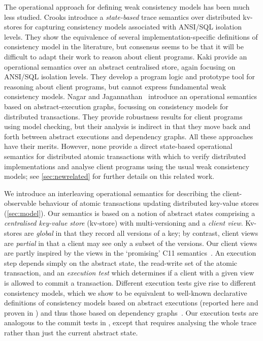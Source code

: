 The operational approach for defining weak consistency models has been
much less studied.  Crooks \etal\citet{seebelieve} introduce
a {\em state-based} trace semantics over distributed kv-stores for
capturing consistency models associated with ANSI/SQL isolation
levels. They show the equivalence of several
implementation-specific definitions of consistency model in the
literature, but  consensus seems to be that it will be difficult to adapt their work to reason about
client programs\cite{givencitationwherethis quoteabout unlikelyis}.  Kaki \etal\citet{alonetogether} provide an
operational semantics over an abstract centralised store, again
focusing on ANSI/SQL isolation levels. They develop a program logic
and prototype tool for reasoning about client programs, but cannot
express fundamental weak consistency models. 
Nagar and Jagannathan~\cite{sureshConcur} introduce an operational semantics based on
abstract-execution graphs, focussing on consistency models for
distributed transactions. They provide robustness results for client
programs using model checking, but their analysis is indirect in that
they move back and forth between abstract executions and dependency
graphs. All these approaches have their merits. However, none 
provide a direct state-based operational semantics for distributed
atomic transactions with which to verify distributed implementations
and analyse client programs using the usual weak consistency models; 
see \cref{sec:newrelated} for further details on this related work. 



We introduce an interleaving operational semantics for describing the
client-observable behaviour of atomic transactions 
updating distributed key-value stores  (\cref{sec:model}). Our semantics is
based on a notion of abstract states comprising a \emph{centralised key-value store} (kv-store) with {multi-versioning} and a \emph{client view}.
Kv-stores are {\em global} in that they record all versions of a key; 
by contrast, client views are {\em partial} in that a client may see only a subset of the versions. 
Our client views are partly inspired by the views in the `promising' C11 semantics~\cite{promises}. 
An execution step depends simply on the abstract state, the read-write set of the atomic transaction, and an \emph{execution test} which
determines if a client with a given view is allowed to commit a transaction. Different execution tests give rise to different
consistency models, 
which we show to be equivalent to well-known
declarative definitions of consistency models based on abstract executions 
(reported here and proven in \cite{shale-phd}) and thus those based on dependency graphs~\cite{laws}. 
Our execution tests are analogous to the commit tests in \cite{seebelieve},
except that \cite{seebelieve} requires analysing the whole trace rather than just the current abstract state. 

